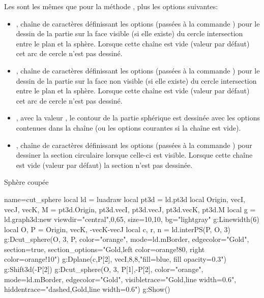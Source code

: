 Les  sont les mêmes que pour la méthode , plus les options suivantes:
\begin{itemize}
    \item {}, chaîne de caractères définissant les options (passées à la commande \drawcmd) pour le dessin de la partie sur la face visible (si elle existe) du cercle intersection entre le plan et la sphère. Lorsque cette chaîne est vide (valeur par défaut) cet arc de cercle n'est pas dessiné.
    
    \item {}, chaîne de caractères définissant les options (passées à la commande \drawcmd) pour le dessin de la partie sur la face non visible (si elle existe) du cercle intersection entre le plan et la sphère. Lorsque cette chaîne est vide (valeur par défaut) cet arc de cercle n'est pas dessiné.    
    
    \item {}, avec la valeur \true, le contour de la partie sphérique est dessinée avec les options contenues dans la chaîne  (ou les options courantes si la chaîne est vide).
    
    \item {}, chaîne de caractères définissant les options (passées à la commande \drawcmd) pour dessiner la section circulaire lorsque celle-ci est visible. Lorsque cette chaîne est vide (valeur par défaut) la section n'est pas dessinée.
\end{itemize}

\begin{demo}{Sphère coupée}
\begin{luadraw}{name=cut_sphere}
local ld = luadraw
local pt3d = ld.pt3d
local Origin, vecI, vecJ, vecK, M = pt3d.Origin, pt3d.vecI, pt3d.vecJ, pt3d.vecK, pt3d.M
local g = ld.graph3d:new{ viewdir={"central",0,65}, size={10,10}, bg="lightgray"}
g:Linewidth(6)
local O, P = Origin, {vecK, -vecK-vecJ}
local c, r, n = ld.interPS(P, {O, 3})
g:Dcut_sphere(O, 3, P, {color="orange", mode=ld.mBorder, edgecolor="Gold", section=true,
    section_options="Gold,left color=orange!80, right color=orange!10"})
g:Dplane({c,P[2]}, vecI,8,8,"fill=blue, fill opacity=0.3")
g:Shift3d(-P[2])
g:Dcut_sphere(O, 3, {P[1],-P[2]}, 
    {color="orange", mode=ld.mBorder, edgecolor="Gold", visibletrace="Gold,line width=0.6",
     hiddentrace="dashed,Gold,line width=0.6"})
g:Show()
\end{luadraw}
\end{demo}

